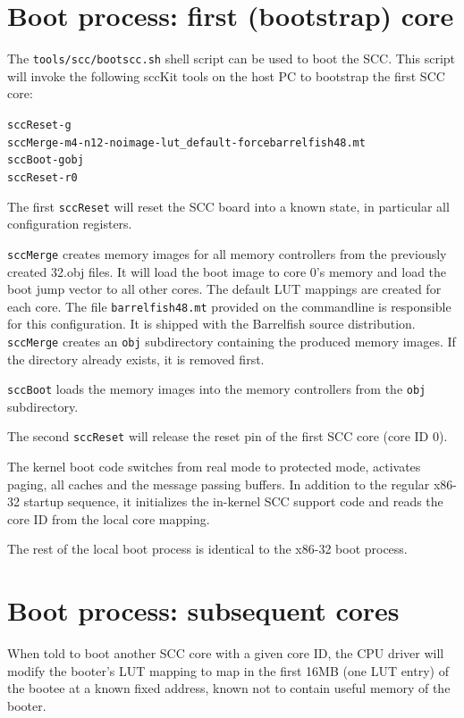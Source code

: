 \documentclass[a4paper,twoside]{report} %
\begin{document}
\section{Boot process: first (bootstrap) core}

The \verb+tools/scc/bootscc.sh+ shell script can be used to boot the
SCC. This script will invoke the following sccKit tools on the host PC
to bootstrap the first SCC core:

\begin{alltt}
  sccReset -g
  sccMerge -m4 -n12 -noimage -lut\_default -force barrelfish48.mt
  sccBoot -g obj
  sccReset -r 0
\end{alltt}

The first \texttt{sccReset} will reset the SCC board into a known
state, in particular all configuration registers.

\texttt{sccMerge} creates memory images for all memory controllers
from the previously created 32.obj files. It will load the boot image
to core 0's memory and load the boot jump vector to all other
cores. The default LUT mappings are created for each core. The file
\texttt{barrelfish48.mt} provided on the commandline is responsible
for this configuration. It is shipped with the Barrelfish source
distribution. \texttt{sccMerge} creates an \texttt{obj} subdirectory
containing the produced memory images. If the directory already
exists, it is removed first.

\texttt{sccBoot} loads the memory images into the memory controllers
from the \texttt{obj} subdirectory.

The second \texttt{sccReset} will release the reset pin of the first
SCC core (core ID 0).

The kernel boot code switches from real mode to protected mode,
activates paging, all caches and the message passing buffers. In
addition to the regular x86-32 startup sequence, it initializes the
in-kernel SCC support code and reads the core ID from the local core
mapping.

The rest of the local boot process is identical to the x86-32 boot
process.

\section{Boot process: subsequent cores}

When told to boot another SCC core with a given core ID, the CPU
driver will modify the booter's LUT mapping to map in the first 16MB
(one LUT entry) of the bootee at a known fixed address, known not to
contain useful memory of the booter.
\end{document}
